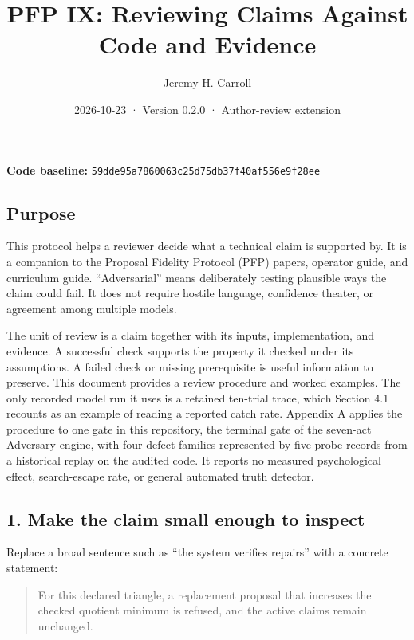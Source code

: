 \documentclass[
  11pt,
]{article}
\title{PFP IX: Reviewing Claims Against Code and Evidence}
\author{Jeremy H. Carroll}
\date{2026-10-23 · Version 0.2.0 · Author-review extension}
\begin{document}
\makeatletter
\begin{center}
{\LARGE \@title\par}
\vspace{0.8em}
{\normalsize \@author\par}
\vspace{0.5em}
{\small \@date\par}
\end{center}
\makeatother

\textbf{Code baseline:}
\nolinkurl{59dde95a7860063c25d75db37f40af556e9f28ee}

\subsection{Purpose}\label{purpose}

This protocol helps a reviewer decide what a technical claim is
supported by. It is a companion to the Proposal Fidelity Protocol (PFP)
papers, operator guide, and curriculum guide. ``Adversarial'' means
deliberately testing plausible ways the claim could fail. It does not
require hostile language, confidence theater, or agreement among
multiple models.

The unit of review is a claim together with its inputs, implementation,
and evidence. A successful check supports the property it checked under
its assumptions. A failed check or missing prerequisite is useful
information to preserve. This document provides a review procedure and
worked examples. The only recorded model run it uses is a retained
ten-trial trace, which Section 4.1 recounts as an example of reading a
reported catch rate. Appendix A applies the procedure to one gate in
this repository, the terminal gate of the seven-act Adversary engine, with
four defect families represented by five probe records from a historical
replay on the audited code. It reports no measured psychological effect,
search-escape rate, or general automated truth detector.

\subsection{1. Make the claim small enough to
inspect}\label{make-the-claim-small-enough-to-inspect}

Replace a broad sentence such as ``the system verifies repairs'' with a
concrete statement:

\begin{quote}
For this declared triangle, a replacement proposal that increases the
checked quotient minimum is refused, and the active claims remain
unchanged.
\end{quote}
\end{document}
